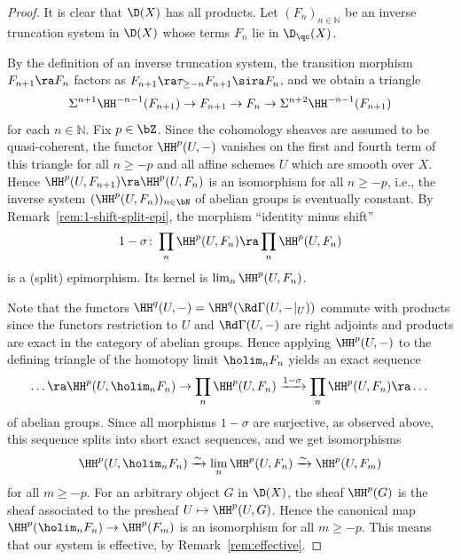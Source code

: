 \begin{proof}
  It is clear that $\D(X)$ has all products.
  Let $(F_n)_{n \in \mathbb{N}}$
  be an inverse truncation system 
  in $\D(X)$ whose terms $F_n$ lie in $\D_\qc(X)$.

  By the definition of an inverse truncation system, the 
  transition morphism
  $F_{n+1} \ra F_n$ factors as 
  $F_{n+1} \ra \tau_{\geq -n}F_{n+1} \sira F_n$, 
  and we obtain a triangle
  \begin{equation*}
    \Sigma^{n + 1}\HH^{-n-1}(F_{n+1})
    \to F_{n+1}
    \to F_n
    \to \Sigma^{n + 2}\HH^{-n-1}(F_{n+1})
  \end{equation*}
  for each $n \in \mathbb{N}$.
  Fix $p \in \bZ$. 
  Since the cohomology sheaves are assumed to be quasi-coherent,
  the functor $\HH^p(U, -)$ vanishes on the first and fourth term of
  this triangle 
  for 
  all $n \geq -p$ and all affine schemes $U$ which are smooth
  over $X$. 
  Hence $\HH^p(U, F_{n+1}) \ra \HH^p(U, F_n)$ is an isomorphism
  for all $n \geq -p$, i.e., 
  the inverse system 
  $(\HH^p(U, F_n))_{n \in \bN}$
  of abelian groups
  is eventually constant.
  By Remark~\ref{rem:1-shift-split-epi}, 
  the morphism ``identity minus shift''
  \begin{equation*}
    1-\sigma \colon \prod_n\HH^p(U,F_n)
    \ra \prod_n \HH^p(U,F_n)
  \end{equation*}
  is a (split) epimorphism. Its kernel is $\lim_n \HH^p(U,F_n)$.

  Note that the functors $\HH^q(U, -) = \HH^q(\Rd \Gamma(U, -|_U))$
  commute with 
  products since the functors restriction to $U$ and $\Rd
  \Gamma(U, -)$ are right 
  adjoints and products 
  are exact in the category of abelian groups.
  Hence applying $\HH^p(U, -)$
  to the defining triangle of the homotopy limit $\holim_n F_n$ 
  yields an exact sequence
  \begin{equation*}
    \dots
    \ra
    \HH^p(U, \holim_n F_n) \to 
    \prod_n \HH^p(U, F_n) \xrightarrow{1 - \sigma} 
    \prod_n \HH^p(U, F_n)
    \ra
    \dots
  \end{equation*}
  of abelian groups. Since all morphisms $1-\sigma$ are
  surjective, as observed above, this sequence splits into 
  short exact sequences, and
  we get isomorphisms
  \begin{equation*}
    \HH^p(U,\holim_n F_n) 
    \xrightarrow{\sim}
    \lim_n \HH^p(U,F_n)
    \xrightarrow{\sim}
    \HH^p(U,F_m)
  \end{equation*}
  for all $m \geq -p$.
  For an arbitrary object $G$ in $\D(X)$,
  the sheaf $\HH^p(G)$ is 
  the sheaf associated to the presheaf
  $U \mapsto \HH^p(U, G)$.
  Hence the canonical map $\HH^p(\holim_n F_n) \to
  \HH^p(F_m)$ 
  is an isomorphism for all $m \geq -p$.
  This means that our system is effective, 
  by Remark~\ref{rem:effective}.
\end{proof}

